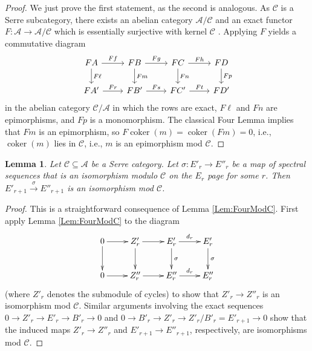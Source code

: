 \documentclass[11pt]{amsart}
\newtheorem{lemma}[equation]{Lemma}
\theoremstyle{definition}
\numberwithin{equation}{subsection} %
\def\l{\mathbb{L}}
\def\coker{\operatorname{coker}}
\renewcommand{\l}{\overset}
\newcommand{\too}[1]{\l{#1}\to}
\begin{document}
\begin{proof}
We just prove the first statement, as the second is analogous.
As $\mathcal{C}$ is a Serre subcategory, there exists an abelian category $\mathcal{A}/\mathcal{C}$ and an exact functor $F: \mathcal{A} \to \mathcal{A}/\mathcal{C}$ which is essentially surjective with kernel $\mathcal{C}$ \cite[Lemma 02MS]{Stacks}. Applying $F$ yields a commutative diagram
\[
\begin{tikzcd}
FA \arrow{r}{Ff} \arrow{d}{F\ell} & FB \arrow{r}{Fg} \arrow{d}{Fm} & FC \arrow{r}{Fh} \arrow{d}{Fn} & FD \arrow{d}{Fp}\\
FA' \arrow{r}{Fr} & FB' \arrow{r}{Fs} & FC' \arrow{r}{Ft} & FD' 
\end{tikzcd}
\]
in the abelian category $\mathcal{C}/\mathcal{A}$ in which the rows are exact, $F\ell$ and $Fn$ are epimorphisms, and $Fp$ is a monomorphism. The classical Four Lemma implies that $Fm$ is an epimorphism, so $F\coker(m)=\coker(Fm)=0$, i.e., $\coker(m)$ lies in $\mathcal{C}$, i.e., $m$ is an epimorphism mod $\mathcal{C}$. 
\end{proof}

\begin{lemma} \label{lem:sseq-iso-mod-serre}
Let $\mathcal{C}\subseteq \mathcal{A}$ be a Serre category.
Let $\sigma:E'_r \to E''_r$ be a map of spectral sequences that is an isomorphism modulo $\mathcal{C}$ on the $E_r$ page for some $r$. Then $E'_{r+1} \too{\sigma} E''_{r+1}$ is an isomorphism mod $\mathcal{C}$.
\end{lemma}

\begin{proof}
This is a straightforward consequence of Lemma \ref{Lem:FourModC}. First apply Lemma \ref{Lem:FourModC} to the diagram
$$ \xymatrix{
0\ar[r]\ar[d] & Z'_r\ar[r]\ar[d] & E'_r\ar[r]^-{d_r}\ar[d]^\sigma & E'_r\ar[d]^\sigma
\\0\ar[r] & Z''_r\ar[r] & E''_r\ar[r]^-{d_r} & E''_r
}$$
(where $Z'_r$ denotes the submodule of cycles) to show that $Z'_r\to Z''_r$ is an isomorphism mod $\mathcal{C}$. Similar arguments involving the exact sequences $0\to Z'_r \to E'_r \to B'_r \to 0$ and $0\to B'_r \to Z'_r \to Z'_r/B'_r= E'_{r+1}\to 0$ show that the induced maps $Z'_r\to Z''_r$ and $E'_{r+1}\to E''_{r+1}$, respectively, are isomorphisms mod $\mathcal{C}$.
\end{proof}
\end{document}
